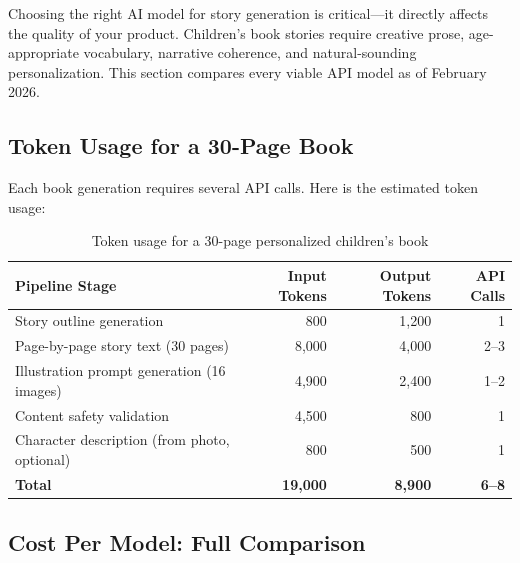\documentclass[12pt, letterpaper, oneside]{book}
\begin{document}
Choosing the right AI model for story generation is critical---it directly affects the quality of your product. Children's book stories require creative prose, age-appropriate vocabulary, narrative coherence, and natural-sounding personalization. This section compares every viable API model as of February 2026.

\subsection{Token Usage for a 30-Page Book}

Each book generation requires several API calls. Here is the estimated token usage:

\begin{table}[H]
\centering
\small
\begin{tabularx}{\textwidth}{Xrrr}
\toprule
\textbf{Pipeline Stage} & \textbf{Input Tokens} & \textbf{Output Tokens} & \textbf{API Calls} \\
\midrule
Story outline generation & 800 & 1{,}200 & 1 \\
Page-by-page story text (30 pages) & 8{,}000 & 4{,}000 & 2--3 \\
Illustration prompt generation (16 images) & 4{,}900 & 2{,}400 & 1--2 \\
Content safety validation & 4{,}500 & 800 & 1 \\
Character description (from photo, optional) & 800 & 500 & 1 \\
\midrule
\textbf{Total} & \textbf{19{,}000} & \textbf{8{,}900} & \textbf{6--8} \\
\bottomrule
\end{tabularx}
\caption{Token usage for a 30-page personalized children's book}
\end{table}

\subsection{Cost Per Model: Full Comparison}
\end{document}
